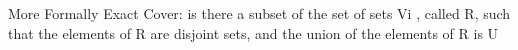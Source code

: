 \documentclass[preview]{standalone}
\begin{document}
\begin{center}
More Formally \n Exact Cover:  is there a subset of the set of sets {Vi }, called R,
such that the elements of R are disjoint sets, and the union of
the elements of R is U
\end{center}
\end{document}
